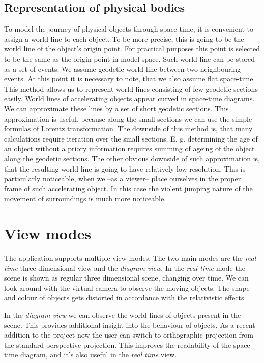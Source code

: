 \documentclass{egpubl}
\begin{document}
\subsection{Representation of physical bodies}
To model the journey of physical objects through space-time, it is convenient to assign a world line to each object. To be more precise, this is going to be the world line of the object's origin point. For practical purposes this point is selected to be the same as the origin point in model space. Such world line can be stored as a set of events. We assume geodetic world line between two neighbouring events. At this point it is necessary to note, that we also assume flat space-time. This method allows us to represent world lines consisting of few geodetic sections easily. World lines of accelerating objects appear curved in space-time diagrams. We can approximate these lines by a set of short geodetic sections. This approximation is useful, because along the small sections we can use the simple formulas of Lorentz transformation. The downside of this method is, that many calculations require iteration over the small sections. E. g. determining the age of an object without a priory information requires summing of ageing of the object along the geodetic sections. The other obvious downside of such approximation is, that the resulting world line is going to have relatively low resolution. This is particularly noticeable, when we --as a viewer-- place ourselves in the proper frame of such accelerating object. In this case the violent jumping nature of the movement of surroundings is much more noticeable.

\section{View modes}
The application supports multiple view modes. The two main modes are the \emph{real time} three dimensional view and the \emph{diagram view}. In the \emph{real time} mode the scene is shown as regular three dimensional scene, changing over time. We can look around with the virtual camera to observe the moving objects. The shape and colour of objects gets distorted in accordance with the relativistic effects. 

In the \emph{diagram view} we can observe the world lines of objects present in the scene. This provides additional insight into the behaviour of objects. As a recent addition to the project now the user can switch to orthographic projection from the standard perspective projection. This improves the readability of the space-time diagram, and it's also useful in the \emph{real time} view.
\end{document}
